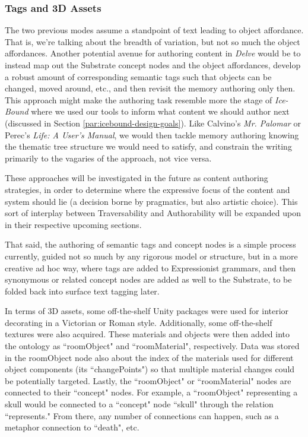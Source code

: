 \subsubsection{Tags and 3D Assets}\label{subsubsec:delve-tags-and-3d-assets}

The two previous modes assume a standpoint of text leading to object affordance. That is, we're talking about the breadth of variation, but not so much the object affordances. Another potential avenue for authoring content in \textit{Delve} would be to instead map out the Substrate concept nodes and the object affordances, develop a robust amount of corresponding semantic tags such that objects can be changed, moved around, etc., and then revisit the memory authoring only then. This approach might make the authoring task resemble more the stage of \textit{Ice-Bound} where we used our tools to inform what content we should author next (discussed in Section \ref{par:icebound-design-goals}). Like Calvino's \textit{Mr. Palomar} or Perec's \textit{Life: A User's Manual}, we would then tackle memory authoring knowing the thematic tree structure we would need to satisfy, and constrain the writing primarily to the vagaries of the approach, not vice versa.

These approaches will be investigated in the future as content authoring strategies, in order to determine where the expressive focus of the content and system should lie (a decision borne by pragmatics, but also artistic choice). This sort of interplay between Traversability and Authorability will be expanded upon in their respective upcoming sections.

That said, the authoring of semantic tags and concept nodes is a simple process currently, guided not so much by any rigorous model or structure, but in a more creative ad hoc way, where tags are added to Expressionist grammars, and then synonymous or related concept nodes are added as well to the Substrate, to be folded back into surface text tagging later.

In terms of 3D assets, some off-the-shelf Unity packages were used for interior decorating in a Victorian or Roman style. Additionally, some off-the-shelf textures were also acquired. These materials and objects were then added into the ontology as ``roomObject" and ``roomMaterial", respectively. Data was stored in the roomObject node also about the index of the materials used for different object components (its ``changePoints") so that multiple material changes could be potentially targeted. Lastly, the ``roomObject" or ``roomMaterial" nodes are connected to their ``concept" nodes. For example, a ``roomObject" representing a skull would be connected to a ``concept" node ``skull" through the relation ``represents." From there, any number of connections can happen, such as a metaphor connection to ``death", etc.

